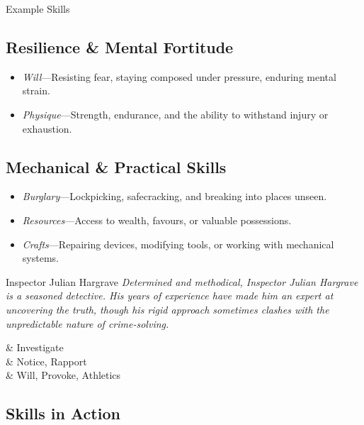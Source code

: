 \begin{multicols}{2}
\begin{WyrdExampleSidebar}{Example Skills}
		\subsection*{Resilience \& Mental Fortitude}  
		\begin{itemize}
			\item \emph{Will}---Resisting fear, staying composed under pressure, enduring mental strain.
			\item \emph{Physique}---Strength, endurance, and the ability to withstand injury or exhaustion.
		\end{itemize}

		\subsection*{Mechanical \& Practical Skills}  
		\begin{itemize}
			\item \emph{Burglary}---Lockpicking, safecracking, and breaking into places unseen.
			\item \emph{Resources}---Access to wealth, favours, or valuable possessions.
			\item \emph{Crafts}---Repairing devices, modifying tools, or working with mechanical systems.
		\end{itemize}
	\end{WyrdExampleSidebar}

	\columnbreak

	\begin{WyrdNPC}{Inspector Julian Hargrave}
		\emph{Determined and methodical, Inspector Julian Hargrave is a seasoned detective. His years of experience have made him an expert at uncovering the truth, though his rigid approach sometimes clashes with the unpredictable nature of crime-solving.}

		\vspace{0.5\baselineskip}
		\begin{SkillsBox}
			\Expert & Investigate \\
			\Skilled & Notice, Rapport \\
			\Novice & Will, Provoke, Athletics \\
		\end{SkillsBox}
	\end{WyrdNPC}

	\end{multicols}

\EndBoxPage

\subsection{Skills in Action}

